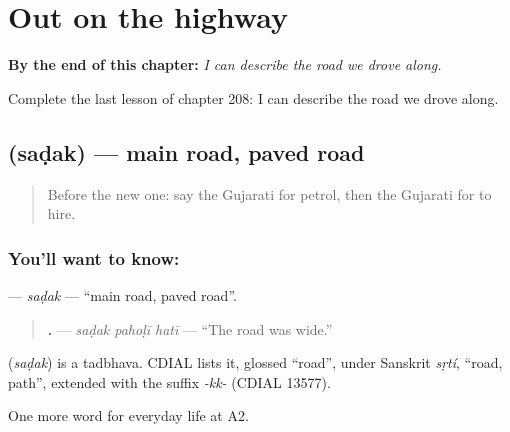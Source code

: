 
\chapter{Out on the highway}
\label{ch:gu-out-on-the-highway}

\begin{chapteropening}
\textbf{By the end of this chapter:} \emph{I can describe the road we drove along.}

Complete the last lesson of chapter 208: I can describe the road we drove along.
\end{chapteropening}

\section[\texorpdfstring{\gu{સડક} (saḍak)}{સડક (saḍak)}]{ (saḍak) — main road, paved road}

\label{lesson:GU-C208-sadak}



\begin{quote}
Before the new one: say the Gujarati for petrol, then the Gujarati for to hire.
\end{quote}

\subsection*{You'll want to know: }
\textbf{} — \emph{saḍak} — \textquotedblleft{}main road, paved road\textquotedblright{}.

\begin{quote}
\textbf{  .} — \emph{saḍak pahoḷī hatī} — \textquotedblleft{}The road was wide.\textquotedblright{}
\end{quote}

\begin{cousinweb}
\textbf{} (\emph{saḍak}) is a tadbhava. CDIAL lists it, glossed \textquotedblleft{}road\textquotedblright{}, under Sanskrit \emph{sṛtí}, \textquotedblleft{}road, path\textquotedblright{}, extended with the suffix \emph{-kk-} (CDIAL 13577).
\end{cousinweb}

\begin{grammarlens}[title={What you've built}]
One more word for everyday life at A2.
\end{grammarlens}

